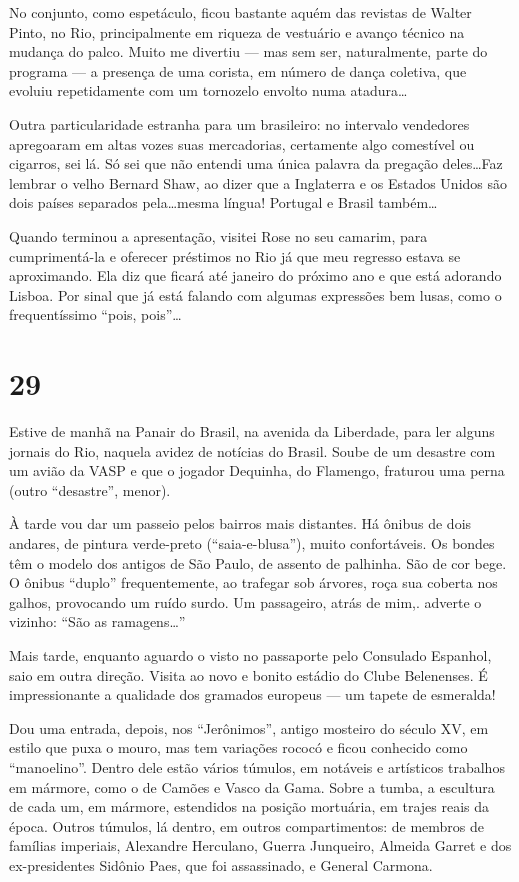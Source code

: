 No conjunto, como espetáculo, ficou bastante aquém das revistas de Walter Pinto, no Rio, principalmente em riqueza de vestuário e avanço técnico na mudança do palco. Muito me divertiu --- mas sem ser, naturalmente, parte do programa --- a presença de uma corista, em número de dança coletiva, que evoluiu repetidamente com um tornozelo envolto numa atadura\ldots

Outra particularidade estranha para um brasileiro: no intervalo vendedores apregoaram em altas vozes suas mercadorias, certamente algo comestível ou cigarros, sei lá. Só sei que não entendi uma única palavra da pregação deles\ldots Faz lembrar o velho Bernard Shaw, ao dizer que a Inglaterra e os Estados Unidos são dois países separados pela\ldots mesma língua! Portugal e Brasil também\ldots

Quando terminou a apresentação, visitei Rose no seu camarim, para cumprimentá-la e oferecer préstimos no Rio já que meu regresso estava se aproximando. Ela diz que ficará até janeiro do próximo ano e que está adorando Lisboa. Por sinal que já está falando com algumas expressões bem lusas, como o frequentíssimo ``pois, pois''\ldots

\section*{29 \adfflatleafright {}}
Estive de manhã na Panair do Brasil, na avenida da Liberdade, para ler alguns jornais do Rio, naquela avidez de notícias do Brasil. Soube de um desastre com um avião da VASP e que o jogador Dequinha, do Flamengo, fraturou uma perna (outro ``desastre'', menor).

À tarde vou dar um passeio pelos bairros mais distantes. Há ônibus de dois andares, de pintura verde-preto (``saia-e-blusa''), muito confortáveis. Os bondes têm o modelo dos antigos de São Paulo, de assento de palhinha. São de cor bege. O ônibus ``duplo'' frequentemente, ao trafegar sob árvores, roça sua coberta nos galhos, provocando um ruído surdo. Um passageiro, atrás de mim,. adverte o vizinho: ``São as ramagens\ldots''

Mais tarde, enquanto aguardo o visto no passaporte pelo Consulado Espanhol, saio em outra direção. Visita ao novo e bonito estádio do Clube Belenenses. É impressionante a qualidade dos gramados europeus --- um tapete de esmeralda!

Dou uma entrada, depois, nos ``Jerônimos'', antigo mosteiro do século XV, em estilo que puxa o mouro, mas tem variações rococó e ficou conhecido como ``manoelino''. Dentro dele estão vários túmulos, em notáveis e artísticos trabalhos em mármore, como o de Camões e Vasco da Gama. Sobre a tumba, a escultura de cada um, em mármore, estendidos na posição mortuária, em trajes reais da época. Outros túmulos, lá dentro, em outros compartimentos: de membros de famílias imperiais, Alexandre Herculano, Guerra Junqueiro, Almeida Garret e dos ex-presidentes Sidônio Paes, que foi assassinado, e General Carmona.

